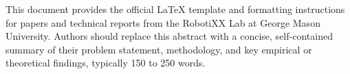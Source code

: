 This document provides the official \LaTeX{} template and formatting instructions for papers and technical reports from the RobotiXX Lab at George Mason University. Authors should replace this abstract with a concise, self-contained summary of their problem statement, methodology, and key empirical or theoretical findings, typically 150 to 250 words.
